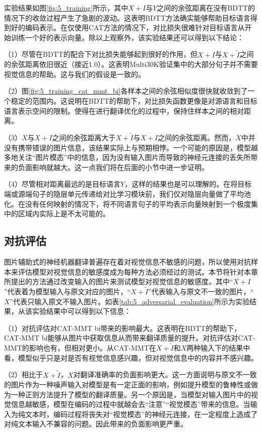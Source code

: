 实验结果如图\ref{fig:5_training}所示，其中$X+I$与$Y$之间的余弦距离在没有BDTT的情况下的收敛过程产生了急剧的波动。这表明BDTT方法确实能够帮助目标语言得到好的编码表示。在仅使用CAT方法的情况下，对比损失很难针对目标语言从开始训练一个好的表示向量。除以上观察外，该实验结果还可以得到以下结论：

（1）尽管在BDTT的配合下对比损失能够起到很好的作用，但$X+I$与$X+\tilde{I}$之间的余弦距离依旧很近（接近1.0）。这表明Multi30K验证集中的大部分句子并不需要视觉信息的帮助。这与我们的假设是一致的。

（2）图\ref{fig:5_training_cat_mmt_bi}各样本之间的余弦相似度很快就收敛到了一个稳定的范围内。这说明在BDTT的帮助下，对比损失函数更像是对源语言和目标语言表示空间的限制。使得在进行翻译优化的过程中，保持住样本之间的相对距离。

（3）$X$与$X+I$之间的余弦距离大于$X+\tilde{I}$与$X+I$之间的余弦距离。然而，$X$中并没有携带错误的图片信息，该结果实际上与预期相悖。一个可能的原因是，模型越多地关注“图片模态”中的信息，因为没有输入图片而导致的神经元连接的丢失所带来的负面影响就越大。这一点我们将在后面的小节中进一步证明。

（4）尽管相对距离最远的是目标语言$Y$，这样的结果也是可以理解的。在将目标端或源端句子的隐层单元传递给对比学习模块前，我们仅对隐层向量做了平均池化。在没有任何映射的情况下，将不同语言句子的平均表示向量映射到一个极度集中的区域内实际上是不太可能的。

\subsection{对抗评估}
\label{sec:5_adversarial_evaluation}

图片辅助式的神经机器翻译普遍存在着对视觉信息不敏感的问题，所以使用对抗样本来评估模型对视觉信息的敏感度成为每种方法必须经过的测试。本节将针对本章所提出的方法通过改变输入的图片来测试模型对视觉信息的敏感度。其中“$X+I$”代表着为模型输入与原文对应的图片，“$X+\tilde{I}$”代表输入与原文不一致的图片，“$X$”代表只输入原文不输入图片。如表\ref{tab:5_adversarial_evaluation}所示为实验结果，从该实验结果中可以得到以下信息：

（1）对抗评估对CAT-MMT bi带来的影响最大。这表明在BDTT的帮助下，CAT-MMT bi能够从图片中获取信息从而带来翻译质量的提升。对抗评估对CAT-MMT的影响也有，但相对更小。从CAT-MMT在$X+\tilde{I}$和$X$两种输入下的结果中看，模型似乎只是对是否有视觉信息感兴趣，但对视觉信息中的内容并不感兴趣。

（2）相比于$X+\tilde{I}$，$X$对翻译准确率的负面影响更大。这一方面说明与原文不一致的图片作为一种噪声输入对模型是有一定正面的影响，例如提升模型的鲁棒性或做为一种正则方法提升了模型的翻译质量。另一个原因是，当模型对输入图片中的视觉信息越敏感，模型在编码的过程中就越会去“注意”“视觉模态”带来的信息。当输入为纯文本时，编码过程将丧失对“视觉模态”的神经元连接，在一定程度上造成了对纯文本输入不兼容的问题。因此带来的负面影响更严重。

